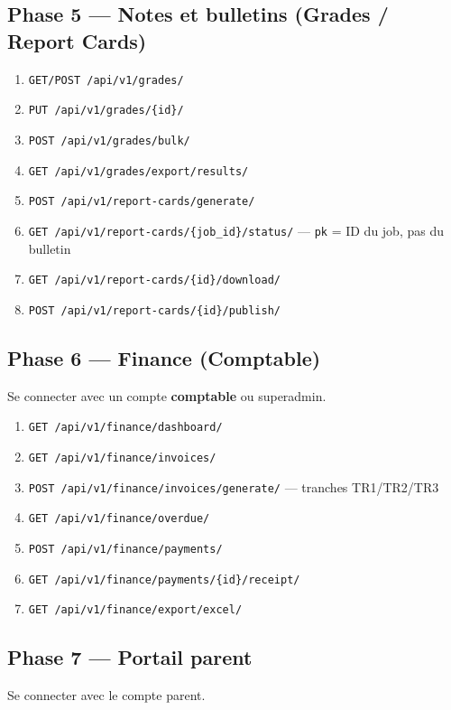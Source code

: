 \documentclass[11pt,a4paper]{article}
\begin{document}
\subsection{Phase 5 --- Notes et bulletins (Grades / Report Cards)}
\begin{enumerate}[noitemsep]
    \item \texttt{GET/POST /api/v1/grades/}
    \item \texttt{PUT /api/v1/grades/\{id\}/}
    \item \texttt{POST /api/v1/grades/bulk/}
    \item \texttt{GET /api/v1/grades/export/results/}
    \item \texttt{POST /api/v1/report-cards/generate/}
    \item \texttt{GET /api/v1/report-cards/\{job\_id\}/status/} --- \texttt{pk} = ID du job, pas du bulletin
    \item \texttt{GET /api/v1/report-cards/\{id\}/download/}
    \item \texttt{POST /api/v1/report-cards/\{id\}/publish/}
\end{enumerate}

\subsection{Phase 6 --- Finance (Comptable)}
Se connecter avec un compte \textbf{comptable} ou superadmin.

\begin{enumerate}[noitemsep]
    \item \texttt{GET /api/v1/finance/dashboard/}
    \item \texttt{GET /api/v1/finance/invoices/}
    \item \texttt{POST /api/v1/finance/invoices/generate/} --- tranches TR1/TR2/TR3
    \item \texttt{GET /api/v1/finance/overdue/}
    \item \texttt{POST /api/v1/finance/payments/}
    \item \texttt{GET /api/v1/finance/payments/\{id\}/receipt/}
    \item \texttt{GET /api/v1/finance/export/excel/}
\end{enumerate}

\subsection{Phase 7 --- Portail parent}
Se connecter avec le compte parent.
\end{document}
